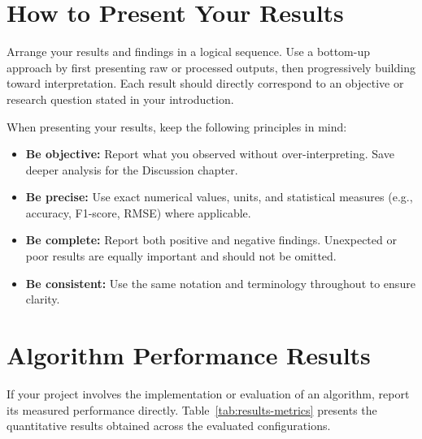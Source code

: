 \section{How to Present Your Results}
\label{sec:how-to-present}

Arrange your results and findings in a logical sequence. Use a bottom-up approach
by first presenting raw or processed outputs, then progressively building toward
interpretation. Each result should directly correspond to an objective or research
question stated in your introduction.

When presenting your results, keep the following principles in mind:
\begin{itemize}
    \item \textbf{Be objective:} Report what you observed without over-interpreting.
    Save deeper analysis for the Discussion chapter.

    \item \textbf{Be precise:} Use exact numerical values, units, and statistical
    measures (e.g., accuracy, F1-score, RMSE) where applicable.

    \item \textbf{Be complete:} Report both positive and negative findings.
    Unexpected or poor results are equally important and should not be omitted.

    \item \textbf{Be consistent:} Use the same notation and terminology throughout
    to ensure clarity.
\end{itemize}

\section{Algorithm Performance Results}
\label{sec:algorithm-results}

If your project involves the implementation or evaluation of an algorithm, report
its measured performance directly. Table~\ref{tab:results-metrics} presents the
quantitative results obtained across the evaluated configurations.


